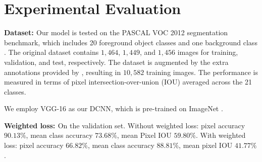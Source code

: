 \section{Experimental Evaluation}
{\bf{Dataset: }} Our model is tested on the PASCAL VOC 2012 segmentation benchmark, which includes 20 foreground object classes and one background class \citep{everingham2014pascal}. The original dataset contains $1,464$, $1,449$, and $1,456$ images for training, validation, and test, respectively. The dataset is augmented by the extra annotations provided by \citep{hariharan2011semantic}, resulting in $10,582$ training images. The performance is measured in terms of pixel intersection-over-union (IOU) averaged across the 21 classes. 

We employ VGG-16 \citep{simonyan2014very} as our DCNN, which is pre-trained on ImageNet \citep{deng2009imagenet}.


{\bf{Weighted loss: }} On the validation set. Without weighted loss: pixel accuracy $90.13\%$, mean class accuracy $73.68\%$, mean Pixel IOU $59.80\%$. With weighted loss: pixel accuracy $66.82\%$, mean class accuracy $88.81\%$, mean pixel IOU $41.77\%$.

